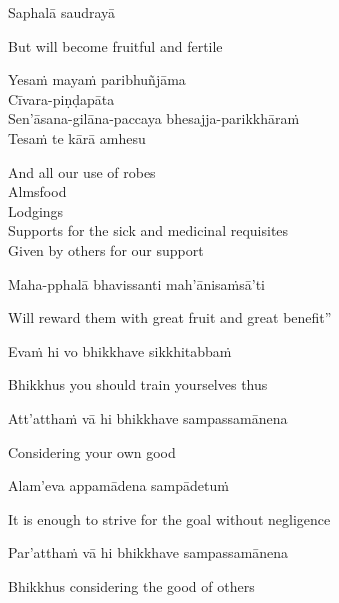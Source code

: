 Saphalā saudrayā

\begin{english}
  But will become fruitful and fertile
\end{english}

Yesaṁ mayaṁ paribhuñjāma\\
Cīvara-piṇḍapāta\\
Sen'āsana-gilāna-paccaya bhesajja-parikkhāraṁ\\
Tesaṁ te kārā amhesu

\begin{english-verses}
  And all our use of robes\\
  Almsfood\\
  Lodgings\\
  Supports for the sick and medicinal requisites\ifdigitalversion\makeatletter\hyperlink{endnote92-appendix}\makeatother\fi\\
  Given by others for our support
\end{english-verses}

Maha-pphalā bhavissanti mah'ānisaṁsā'ti

\begin{english}
  Will reward them with great fruit and great benefit''
\end{english}

Evaṁ hi vo bhikkhave sikkhitabbaṁ

\begin{english}
  Bhikkhus you should train yourselves thus
\end{english}

Att'atthaṁ vā hi bhikkhave sampassamānena

\begin{english}
  Considering your own good
\end{english}

Alam'eva appamādena sampādetuṁ

\begin{english}
  It is enough to strive for the goal without negligence
\end{english}

Par'atthaṁ vā hi bhikkhave sampassamānena

\begin{english}
  Bhikkhus considering the good of others
\end{english}


